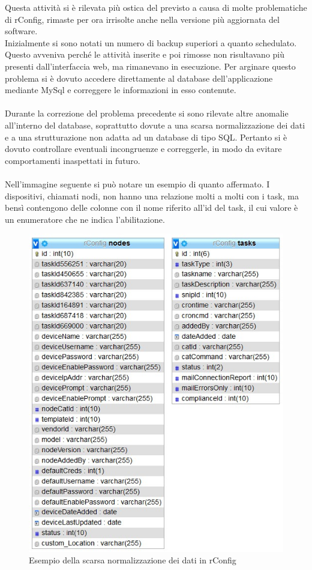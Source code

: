 \documentclass[Realizzazione.tex]{subfiles}
\begin{document}
Questa attività si è rilevata più ostica del previsto a causa di molte problematiche di rConfig, rimaste per ora irrisolte anche nella versione più aggiornata del software. \\
Inizialmente si sono notati un numero di backup superiori a quanto schedulato. Questo avveniva perché le attività inserite e poi rimosse non risultavano più presenti dall'interfaccia web, ma rimanevano in esecuzione. Per arginare questo problema si è dovuto accedere direttamente al database dell'applicazione mediante MySql e correggere le informazioni in esso contenute. \\\\
Durante la correzione del problema precedente si sono rilevate altre anomalie all'interno del database, soprattutto dovute a una scarsa normalizzazione dei dati e a una strutturazione non adatta ad un database di tipo SQL. Pertanto si è dovuto controllare eventuali incongruenze e correggerle, in modo da evitare comportamenti inaspettati in futuro. \\\\
Nell'immagine seguente si può notare un esempio di quanto affermato. I dispositivi, chiamati nodi, non hanno una relazione molti a molti con i task, ma bensì contengono delle colonne con il nome riferito all'id del task, il cui valore è un enumeratore che ne indica l'abilitazione.
\begin{figure}[H]
	\centering
	\includegraphics[width=0.6\linewidth]{"images/rconfig_normalizzazione"}
	\caption{Esempio della scarsa normalizzazione dei dati in rConfig}
	\label{fig:Esempio della scarsa normalizzazione dei dati in rConfig}
\end{figure}
\end{document}
